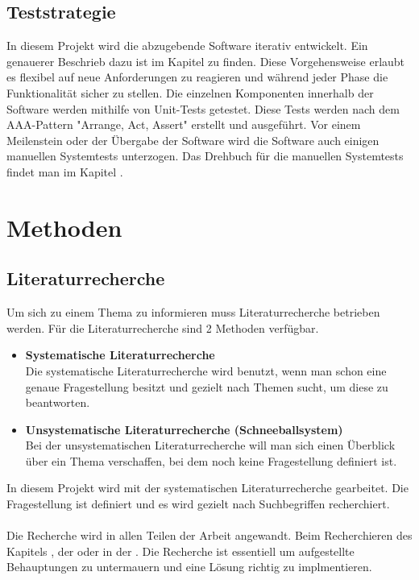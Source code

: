 \documentclass[a4paper, table]{article}
\begin{document}
\subsection{Teststrategie}\label{Teststrategie}
In diesem Projekt wird die abzugebende Software iterativ entwickelt.
Ein genauerer Beschrieb dazu ist im Kapitel  zu finden.
Diese Vorgehensweise erlaubt es flexibel auf neue Anforderungen zu reagieren und
während jeder Phase die Funktionalität sicher zu stellen.
\newline
Die einzelnen Komponenten innerhalb der Software werden mithilfe von Unit-Tests getestet.
Diese Tests werden nach dem AAA-Pattern "Arrange, Act, Assert" erstellt und ausgeführt. \autocite{noauthor_arrangeactassert_nodate}
Vor einem Meilenstein oder der Übergabe der Software wird die Software auch einigen manuellen Systemtests unterzogen.
\newline
Das Drehbuch für die manuellen Systemtests findet man im Kapitel .

\newpage
\section{Methoden}
\subsection{Literaturrecherche}
Um sich zu einem Thema zu informieren muss Literaturrecherche betrieben werden.
Für die Literaturrecherche sind 2 Methoden verfügbar. \autocite{solis_so_2021}
\begin{itemize}
    \item \textbf{Systematische Literaturrecherche}\\
    Die systematische Literaturrecherche wird benutzt, wenn man schon eine genaue Fragestellung besitzt und gezielt nach Themen sucht, um diese zu beantworten.
    \item \textbf{Unsystematische Literaturrecherche (Schneeballsystem)}\\
    Bei der unsystematischen Literaturrecherche will man sich einen Überblick über ein Thema verschaffen, bei dem noch keine Fragestellung definiert ist.
\end{itemize}
In diesem Projekt wird mit der systematischen Literaturrecherche gearbeitet.
Die Fragestellung ist definiert und es wird gezielt nach Suchbegriffen recherchiert.\\\\
Die Recherche wird in allen Teilen der Arbeit angewandt.
Beim Recherchieren des Kapitels , der  oder in der .
Die Recherche ist essentiell um aufgestellte Behauptungen zu untermauern und eine Lösung richtig zu implmentieren. 
\end{document}
